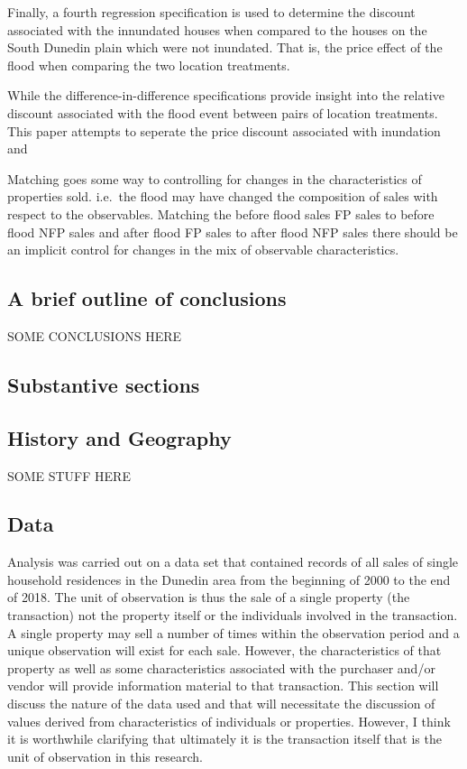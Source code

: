 \documentclass[]{article}
\begin{document}
Finally, a fourth regression specification is used to determine the
discount associated with the innundated houses when compared to the
houses on the South Dunedin plain which were not inundated. That is, the
price effect of the flood when comparing the two location treatments.

While the difference-in-difference specifications provide insight into
the relative discount associated with the flood event between pairs of
location treatments. This paper attempts to seperate the price discount
associated with inundation and

Matching goes some way to controlling for changes in the characteristics
of properties sold. i.e.~the flood may have changed the composition of
sales with respect to the observables. Matching the before flood sales
FP sales to before flood NFP sales and after flood FP sales to after
flood NFP sales there should be an implicit control for changes in the
mix of observable characteristics.

\subsection{A brief outline of
conclusions}\label{a-brief-outline-of-conclusions}

SOME CONCLUSIONS HERE

\subsection{Substantive sections}\label{substantive-sections}

\subsection{History and Geography}\label{history-and-geography}

SOME STUFF HERE

\subsection{Data}\label{data}

Analysis was carried out on a data set that contained records of all
sales of single household residences in the Dunedin area from the
beginning of 2000 to the end of 2018. The unit of observation is thus
the sale of a single property (the transaction) not the property itself
or the individuals involved in the transaction. A single property may
sell a number of times within the observation period and a unique
observation will exist for each sale. However, the characteristics of
that property as well as some characteristics associated with the
purchaser and/or vendor will provide information material to that
transaction. This section will discuss the nature of the data used and
that will necessitate the discussion of values derived from
characteristics of individuals or properties. However, I think it is
worthwhile clarifying that ultimately it is the transaction itself that
is the unit of observation in this research.
\end{document}

